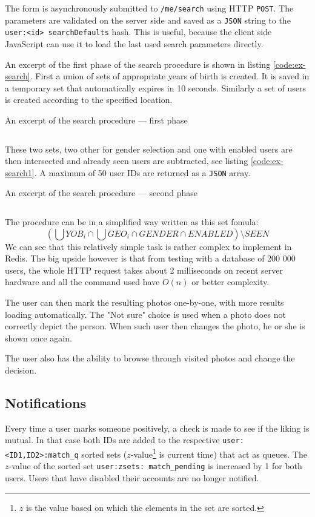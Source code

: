 \documentclass[12pt,oneside]{fithesis}
\begin{document}
		The form is asynchronously submitted to \texttt{/me/search} using HTTP \texttt{POST}. The parameters are validated on the server side and saved as a \texttt{JSON} string to the \texttt{user:<id> searchDefaults} hash. This is useful, because the client side JavaScript can use it to load the last used search parameters directly.
		
		An excerpt of the first phase of the search procedure is shown in listing \ref{code:ex-search}. First a union of sets of appropriate years of birth is created. It is saved in a temporary set that automatically expires in 10 seconds. Similarly a set of users is created according to the specified location.
		
		\begin{program}[h]
		\caption{An excerpt of the search procedure --- first phase}
		\label{code:ex-search}
		\inputminted[fontsize=\scriptsize, linenos=false, gobble=6]{javascript}{ex-search.js}
		\end{program}

		These two sets, two other for gender selection and one with enabled users are then intersected and already seen users are subtracted, see listing \ref{code:ex-search1}. A maximum of 50 user IDs are returned as a \texttt{JSON} array.
		
		\begin{program}[h]
		\caption{An excerpt of the search procedure --- second phase}
		\label{code:ex-search1}
		\inputminted[fontsize=\scriptsize, linenos=false]{javascript}{ex-search1.js}
		\end{program}
	
		The procedure can be in a simplified way written as this set fomula:
		\[
			\left( \bigcup YOB_i \cap \bigcup GEO_i \cap GENDER \cap ENABLED \right) \setminus SEEN
		\]
		We can see that this relatively simple task is rather complex to implement in Redis. The big upside however is that from testing with a database of 200 000 users, the whole HTTP request takes about 2 milliseconds on recent server hardware and all the command used have $O(n)$ or better complexity.
	
		The user can then mark the resulting photos one-by-one, with more results loading automatically. The "Not sure" choice is used when a photo does not correctly depict the person. When such user then changes the photo, he or she is shown once again. 
		
		The user also has the ability to browse through visited photos and change the decision.
		\clearpage
	\subsection{Notifications}
		Every time a user marks someone positively, a check is made to see if the liking is mutual. In that case  both IDs are added to the respective \texttt{user:<ID1,ID2>:match\_q} sorted sets ($z$-value\footnote{$z$ is the value based on which the elements in the set are sorted.} is current time) that act as queues. The $z$-value of the sorted set \texttt{user:zsets: match\_pending} is increased by 1 for both users. Users that have disabled their accounts are no longer notified.
		
\end{document}
